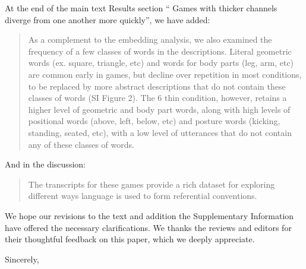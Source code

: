 \documentclass{stanfordletter}
\newcommand{\revised}[1]{\begin{quote}	#1 \end{quote}}
\begin{document}
\begin{letter}{}
          At the end of the main text Results section `` Games with thicker channels diverge from one another more quickly'', we have added:
          
          \revised{As a complement to the embedding analysis, we also examined the frequency of a few classes of words in the descriptions. Literal geometric words (ex. square, triangle, etc) and words for body parts (leg, arm, etc) are common early in games, but decline over repetition in most conditions, to be replaced by more abstract descriptions that do not contain these classes of words (SI Figure 2). The 6 thin condition, however, retains a higher level of geometric and body part words, along with high levels of positional words (above, left, below, etc) and posture words (kicking, standing, seated, etc), with a low level of utterances that do not contain any of these classes of words.}
          
          And in the discussion:
          \revised{The transcripts for these games provide a rich dataset for exploring different ways language is used to form referential conventions. }
          
 We hope our revisions to the text and addition the Supplementary Information have offered the necessary clarifications. We thanks the reviews and editors for their thoughtful feedback on this paper, which we deeply appreciate. 
          
          



          
          \closing{Sincerely,}
	\end{letter}
	
\end{document}
